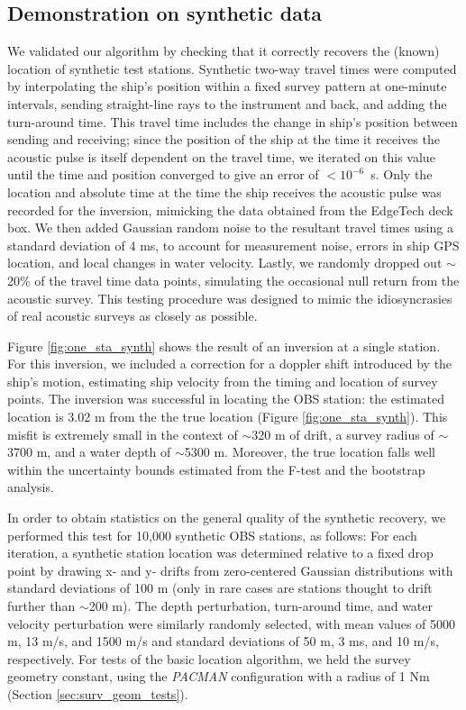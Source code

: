 
\subsection{Demonstration on synthetic data}
We validated our algorithm by checking that it correctly recovers the (known) location of synthetic test stations. Synthetic two-way travel times were computed by interpolating the ship's position within a fixed survey pattern at one-minute intervals, sending straight-line rays to the instrument and back, and adding the turn-around time. This travel time includes the change in ship's position between sending and receiving; since the position of the ship at the time it receives the acoustic pulse is itself dependent on the travel time, we iterated on this value until the time and position converged to give an error of \mbox{$<10^{-6}$ s}. Only the location and absolute time at the time the ship receives the acoustic pulse was recorded for the inversion, mimicking the data obtained from the EdgeTech deck box. We then added Gaussian random noise to the resultant travel times using a standard deviation of 4 ms, to account for measurement noise, errors in ship GPS location, and local changes in water velocity. Lastly, we randomly dropped out $\sim$20\% of the travel time data points, simulating the occasional null return from the acoustic survey. This testing procedure was designed to mimic the idiosyncrasies of real acoustic surveys as closely as possible. 

Figure \ref{fig:one_sta_synth} shows the result of an inversion at a single station. For this inversion, we included a correction for a doppler shift introduced by the ship's motion, estimating ship velocity from the timing and location of survey points. The inversion was successful in locating the OBS station: the estimated location is 3.02 m from the the true location (Figure \ref{fig:one_sta_synth}). This misfit is extremely small in the context of $\sim$320 m of drift, a survey radius of $\sim$3700 m, and a water depth of $\sim$5300 m. Moreover, the true location falls well within the uncertainty bounds estimated from the F-test and the bootstrap analysis. 

In order to obtain statistics on the general quality of the synthetic recovery, we performed this test for 10,000 synthetic OBS stations, as follows: For each iteration, a synthetic station location was determined relative to a fixed drop point by drawing x- and y- drifts from zero-centered Gaussian distributions with standard deviations of 100 m (only in rare cases are stations thought to drift further than $\sim$200 m). The depth perturbation, turn-around time, and water velocity perturbation were similarly randomly selected, with mean values of 5000 m, 13 m/s, and 1500 m/s and standard deviations of 50 m, 3 ms, and 10 m/s, respectively.  For tests of the basic location algorithm, we held the survey geometry constant, using the \textit{PACMAN} configuration with a radius of 1 Nm (Section \ref{sec:surv_geom_tests}). 

